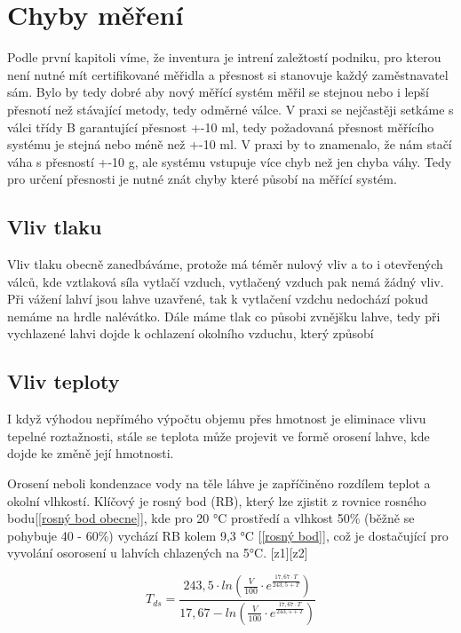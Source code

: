 \section{Chyby měření}
Podle první kapitoli víme, že inventura je intrení zaležtostí podniku, pro kterou není nutné mít certifikované měřidla a přesnost si stanovuje každý zaměstnavatel sám. Bylo by tedy dobré aby nový měřící systém měřil se stejnou nebo i lepší přesnotí než stávající metody, tedy odměrné válce. V praxi se nejčastěji setkáme s válci třídy B garantující přesnost +-10 ml, tedy požadovaná přesnost měřícího systému je stejná nebo méně než +-10 ml. V praxi by to znamenalo, že nám stačí váha s přesností +-10 g, ale systému vstupuje více chyb než jen chyba váhy.
Tedy pro určení přesnosti je nutné znát chyby které působí na měřící systém.
\subsection{Vliv tlaku}
Vliv tlaku obecně zanedbáváme, protože má téměr nulový vliv a to i otevřených válců, kde vztlaková síla vytlačí vzduch, vytlačený vzduch pak nemá žádný vliv. Při vážení lahví jsou lahve uzavřené, tak k vytlačení vzdchu nedochází pokud nemáme na hrdle nalévátko. Dále máme tlak co působi zvnějšku lahve, tedy při vychlazené lahvi dojde k ochlazení okolního vzduchu, který způsobí 

\subsection{Vliv teploty}
I když výhodou nepřímého výpočtu objemu přes hmotnost je eliminace vlivu tepelné roztažnosti, stále se teplota může projevit ve formě orosení lahve, kde dojde ke změně její hmotnosti.

Orosení neboli kondenzace vody na těle láhve je zapříčiněno rozdílem teplot a okolní vlhkostí. Klíčový je rosný bod (RB), který lze zjistit z rovnice rosného bodu[\ref{rosný bod obecne}], kde pro 20 °C prostředí a vlhkost 50\% (běžně se pohybuje 40 - 60\%) vychází RB kolem 9,3 °C [\ref{rosný bod}], což je dostačující pro vyvolání osorosení u lahvích chlazených na 5°C. [z1][z2]

\begin{equation}
T_{ds} = \frac{243,5 \cdot ln(\frac{V}{100} \cdot e^{\frac{17,67 \cdot T}{243,5 + T}})}{17,67 - ln(\frac{V}{100} \cdot e^{\frac{17,67 \cdot T}{243,5 + T}})}
\label{rosný bod obecne}
\end{equation}

